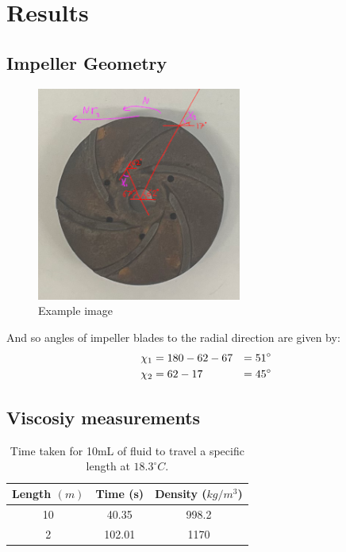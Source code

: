 \documentclass{article}
\begin{document}
\section{Results}


\subsection{Impeller Geometry}

\begin{figure}[H]
    \centering
    \includegraphics[width=0.6\textwidth]{impeller_annotations.png}
    \caption{Example image}
    \label{fig:impeller_annotations}
\end{figure}

And so angles of impeller blades to the radial direction are given by:
\begin{alignat}{2}
    \chi_1 &= 180 - 62 - 67 &= 51^\circ \notag \\
    \chi_2 &= 62 - 17 &= 45^\circ \notag
\end{alignat}

\subsection{Viscosiy measurements}

\begin{table}[H]
    \centering
    \begin{tabular}{|c|c|c|}
        \hline
        \textbf{Length} $(m)$ & \textbf{Time} (s) & \textbf{Density} ($kg/m^3$) \\
        \hline
        10 & 40.35 & 998.2 \\
        2 & 102.01 & 1170 \\
        \hline
    \end{tabular}
    \caption{Time taken for 10mL of fluid to travel a specific length at $18.3^\circ C.$}
    \label{tab:viscosity}
\end{table}
\end{document}
